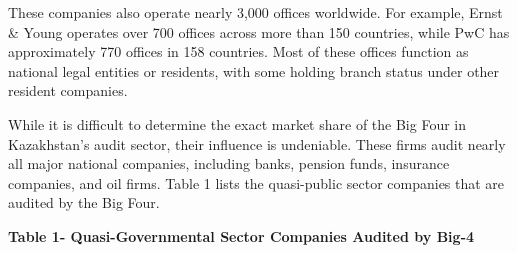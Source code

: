 These companies also operate nearly 3,000 offices worldwide. For
example, Ernst \& Young operates over 700 offices across more than 150
countries, while PwC has approximately 770 offices in 158 countries.
Most of these offices function as national legal entities or residents,
with some holding branch status under other resident companies.

While it is difficult to determine the exact market share of the Big
Four in Kazakhstan's audit sector, their influence is undeniable. These
firms audit nearly all major national companies, including banks,
pension funds, insurance companies, and oil firms. Table 1 lists the
quasi-public sector companies that are audited by the Big Four.

\textbf{Table 1- Quasi-Governmental Sector Companies Audited by Big-4}

